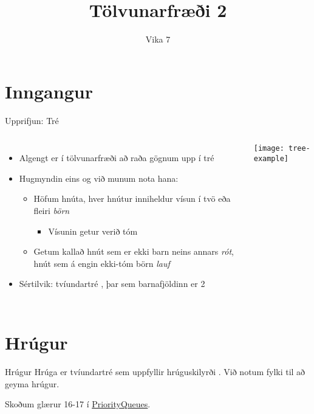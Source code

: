 \documentclass{beamer}
\title{Tölvunarfræði 2}
\subtitle{Vika 7}
\begin{document}
\begin{frame}
\titlepage
\end{frame}

\section{Inngangur}

\begin{frame}{Upprifjun: Tré}
\begin{columns}
\begin{itemize}
 \item Algengt er í tölvunarfræði að raða gögnum upp í tré
 \item Hugmyndin eins og við munum nota hana:
 \begin{itemize}
  \item Höfum hnúta, hver hnútur inniheldur vísun í tvö eða fleiri \emph{börn}
  \begin{itemize}
   \item Vísunin getur verið tóm
  \end{itemize}
  \item Getum kallað hnút sem er ekki barn neins annars \emph{rót}, hnút sem á engin ekki-tóm börn \emph{lauf}
 \end{itemize}
 \item Sértilvik: tvíundartré , þar sem barnafjöldinn er 2
\end{itemize}
\texttt{[image: tree-example]}
\end{columns}
\end{frame}


\section{Hrúgur}

\begin{frame}{Hrúgur}
Hrúga  er tvíundartré sem uppfyllir hrúguskilyrði . Við notum fylki til að geyma hrúgur.

Skoðum glærur 16-17 í \href{http://algs4.cs.princeton.edu/lectures/24PriorityQueues.pdf}{PriorityQueues}.
\end{frame}
\end{document}
